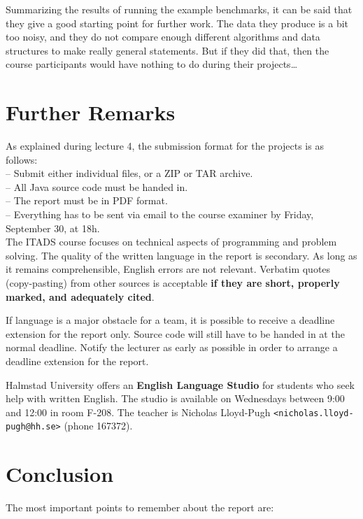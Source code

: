 \documentclass[a4paper,10pt]{article}
\begin{document}
Summarizing the results of running the example benchmarks, it can be said that they give a good starting point for further work.
The data they produce is a bit too noisy, and they do not compare enough different algorithms and data structures to make really general statements.
But if they did that, then the course participants would have nothing to do during their projects\ldots



\section{Further Remarks}

As explained during lecture 4, the submission format for the projects is as follows:\\
-- Submit either individual files, or a ZIP or TAR archive.\\
-- All Java source code must be handed in.\\
-- The report must be in PDF format.\\
-- Everything has to be sent via email to the course examiner by Friday, September 30, at 18h.\\

The ITADS course focuses on technical aspects of programming and problem solving.
The quality of the written language in the report is secondary.
As long as it remains comprehensible, English errors are not relevant.
Verbatim quotes (copy-pasting) from other sources is acceptable \textbf{if they are short, properly marked, and adequately cited}.

If language is a major obstacle for a team, it is possible to receive a deadline extension for the report only.
Source code will still have to be handed in at the normal deadline.
Notify the lecturer as early as possible in order to arrange a deadline extension for the report.

Halmstad University offers an \textbf{English Language Studio} for students who seek help with written English.
The studio is available on Wednesdays between 9:00 and 12:00 in room F-208.
The teacher is Nicholas Lloyd-Pugh \texttt{<nicholas.lloyd-pugh@hh.se>} (phone 167372).



\section{Conclusion}

The most important points to remember about the report are:
\end{document}
